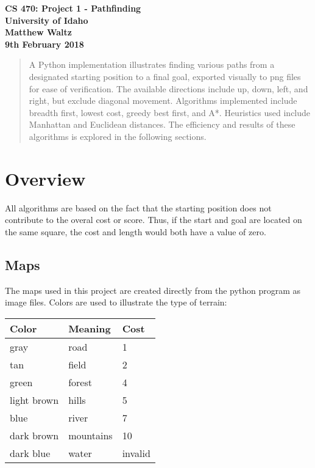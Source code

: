 \documentclass[11pt,letterpaper]{article}
\author{Matthew Waltz}
\begin{document}
\begin{center}
   \textbf{CS 470: Project 1 - Pathfinding} \\
   \textbf{University of Idaho} \\
   \textbf{Matthew Waltz} \\
   \textbf{9th February 2018} \\
\end{center}

\begin{abstract}
A Python implementation illustrates finding various paths from a designated starting position to  a final goal, exported visually to png files for ease of verification.
The available directions include up, down, left, and right, but exclude diagonal movement. Algorithms implemented include breadth first, lowest cost, greedy best first, and A*. Heuristics used include Manhattan and Euclidean distances.
The efficiency and results of these algorithms is explored in the following sections.
\end{abstract}

\tableofcontents

\clearpage
\section{Overview}
All algorithms are based on the fact that the starting position does not contribute to the overal cost or score. Thus, if the start and goal are located on the same square, the cost and length would both have a value of zero.

\subsection{Maps}
The maps used in this project are created directly from the python program as image files.
Colors are used to illustrate the type of terrain: \\
\begin{center}
\begin{tabular}{l | l | l}
Color & Meaning & Cost \\ \hline
gray & road & 1 \\
tan & field & 2 \\
green & forest & 4 \\
light brown & hills & 5 \\
blue & river & 7 \\
dark brown & mountains & 10 \\
dark blue & water & invalid \\
\end{tabular}
\end{center}
\end{document}
